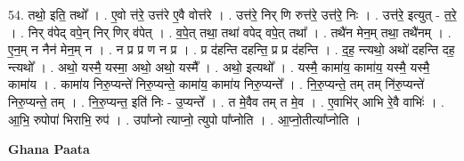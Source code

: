 \documentclass[17pt]{extarticle}
\begin{document}
54. तथो॒ इति॒ तथो᳚ । . ए॒वो त्त॑रे॒ उत्त॑रे ए॒वै वोत्त॑रे । . उत्त॑रे॒ निर् णि रुत्त॑रे॒ उत्त॑रे॒ निः । . उत्त॑रे॒ इत्युत् - त॒रे॒ । . निर् व॑पेद् वपे॒न् निर् णिर् व॑पेत् । . व॒पे॒त् तथा॒ तथा॑ वपेद् वपे॒त् तथा᳚ । . तथै॑न मेन॒म् तथा॒ तथै॑नम् । . ए॒न॒म् न नैन॑ मेन॒म् न । . न प्र प्र ण न प्र । . प्र द॑हन्ति दहन्ति॒ प्र प्र द॑हन्ति । . द॒ह॒ न्त्यथो॒ अथो॑ दहन्ति दह॒ न्त्यथो᳚ । . अथो॒ यस्मै॒ यस्मा॒ अथो॒ अथो॒ यस्मै᳚ । . अथो॒ इत्यथो᳚ । . यस्मै॒ कामा॑य॒ कामा॑य॒ यस्मै॒ यस्मै॒ कामा॑य । . कामा॑य निरु॒प्यन्ते॑ निरु॒प्यन्ते॒ कामा॑य॒ कामा॑य निरु॒प्यन्ते᳚ । . नि॒रु॒प्यन्ते॒ तम् तम् नि॑रु॒प्यन्ते॑ निरु॒प्यन्ते॒ तम् । . नि॒रु॒प्यन्त॒ इति॑ निः - उ॒प्यन्ते᳚ । . त मे॒वैव तम् त मे॒व । . ए॒वाभि॑र् आभि रे॒वै वाभिः॑ । . आ॒भि॒ रुपोपा॑ भिराभि॒ रुप॑ । . उपा᳚प्नो त्याप्नो॒ त्युपो पा᳚प्नोति । . आ॒प्नो॒तीत्या᳚प्नोति । \newline

\textbf{Ghana Paata } \newline
\end{document}
